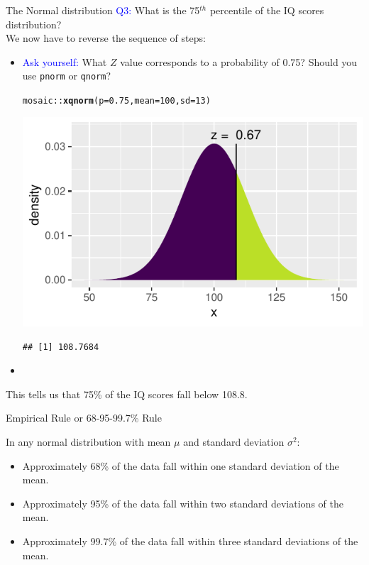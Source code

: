 \documentclass{beamer}\usepackage[]{graphicx}\usepackage[]{color}
\newcommand{\hlnum}[1]{\textcolor[rgb]{0.686,0.059,0.569}{#1}}%
\newcommand{\hlopt}[1]{\textcolor[rgb]{0,0,0}{#1}}%
\newcommand{\hlstd}[1]{\textcolor[rgb]{0.345,0.345,0.345}{#1}}%
\newcommand{\hlkwc}[1]{\textcolor[rgb]{0.333,0.667,0.333}{#1}}%
\newcommand{\hlkwd}[1]{\textcolor[rgb]{0.737,0.353,0.396}{\textbf{#1}}}%
\newenvironment{knitrout}{}{} %
\begin{document}
\begin{frame}[fragile]{The Normal distribution}
	\textcolor{blue}{Q3:}
	What is the 75$^{th}$ percentile of the IQ scores distribution? \\
	We now have to reverse the sequence of steps: \pause
	\begin{itemize}
		\item \textcolor{blue}{Ask yourself:} What $Z$ value corresponds to a probability of 0.75? Should you use \texttt{pnorm} or \texttt{qnorm}? \pause

\begin{knitrout}\scriptsize
{}\color{fgcolor}
\begin{alltt}
\hlstd{mosaic}\hlopt{::}\hlkwd{xqnorm}\hlstd{(}\hlkwc{p} \hlstd{=} \hlnum{0.75}\hlstd{,} \hlkwc{mean} \hlstd{=} \hlnum{100}\hlstd{,} \hlkwc{sd} \hlstd{=} \hlnum{13}\hlstd{)}
\end{alltt}


{\centering \includegraphics[width=0.6\linewidth]{figure/probs8-1} 

}


\begin{verbatim}
## [1] 108.7684
\end{verbatim}

\end{knitrout}

		\item[]
	\end{itemize} This tells us that 75\% of the IQ scores fall below 108.8. 
\end{frame}


\begin{frame}[fragile]{Empirical Rule or 68-95-99.7\% Rule}

In any normal distribution with mean $\mu$ and standard deviation $\sigma^2$:
\begin{itemize}
			\setlength\itemsep{2em}
	\item Approximately 68\% of the data fall within one standard deviation of the mean.
\item Approximately 95\% of the data fall within two standard deviations of the mean.
\item Approximately 99.7\% of the data fall within three standard deviations of the mean.
\end{itemize}
\end{frame}
\end{document}
